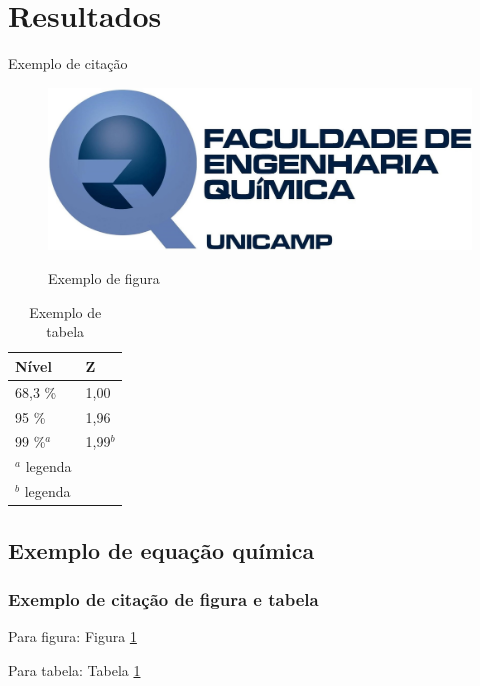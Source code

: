 
\section{Resultados}

Exemplo de citação \cite{Amsons}

\begin{figure}[H]
    \centering
    \caption {Exemplo de figura}
    \includegraphics[scale=0.6]{Imagens/LOGO-EQ.jpg}
    \label{fig:logo}
\end{figure}


\begin{table}[H]
	\centering
	\caption{Exemplo de tabela}
	\label{tab:nivelz}
	\begin{tabular}{l l}
		\hline
		Nível & Z \\ 
		\hline
		68,3 \%      &   1,00\\
		95 \%        &   1,96\\
		99 \%$^a$        &   1,99$^b$\\
		\hline
		\footnotesize{$^a$ legenda} \\
		\footnotesize{$^b$ legenda}\\
	\end{tabular}
\end{table}



\subsection{Exemplo de equação química}



\subsubsection{Exemplo de citação de figura e tabela}

Para figura: Figura \ref{fig:logo}

Para tabela: Tabela \ref{tab:nivelz}

